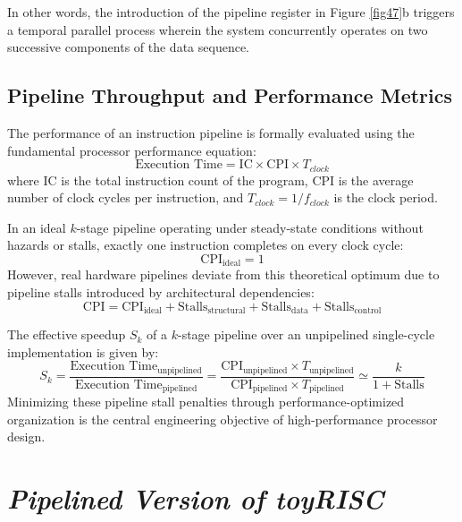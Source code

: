 In other words, the introduction of the pipeline register in Figure \ref{fig47}b triggers a temporal parallel process wherein the system concurrently operates on two successive components of the data sequence.

\subsection{Pipeline Throughput and Performance Metrics}

The performance of an instruction pipeline is formally evaluated using the fundamental processor performance equation:
\begin{equation}
    \text{Execution Time} = \text{IC} \times \text{CPI} \times T_{clock}
\end{equation}
where $\text{IC}$ is the total instruction count of the program, $\text{CPI}$ is the average number of clock cycles per instruction, and $T_{clock} = 1/f_{clock}$ is the clock period.

In an ideal $k$-stage pipeline operating under steady-state conditions without hazards or stalls, exactly one instruction completes on every clock cycle:
\begin{equation}
    \text{CPI}_{\text{ideal}} = 1
\end{equation}
However, real hardware pipelines deviate from this theoretical optimum due to pipeline stalls introduced by architectural dependencies:
\begin{equation}
    \text{CPI} = \text{CPI}_{\text{ideal}} + \text{Stalls}_{\text{structural}} + \text{Stalls}_{\text{data}} + \text{Stalls}_{\text{control}}
\end{equation}

The effective speedup $S_k$ of a $k$-stage pipeline over an unpipelined single-cycle implementation is given by:
\begin{equation}
    S_k = \frac{\text{Execution Time}_{\text{unpipelined}}}{\text{Execution Time}_{\text{pipelined}}} = \frac{\text{CPI}_{\text{unpipelined}} \times T_{\text{unpipelined}}}{\text{CPI}_{\text{pipelined}} \times T_{\text{pipelined}}} \simeq \frac{k}{1 + \text{Stalls}}
\end{equation}
Minimizing these pipeline stall penalties through performance-optimized organization is the central engineering objective of high-performance processor design.


\section{{\bf {\em Pipelined Version of toyRISC}}}

